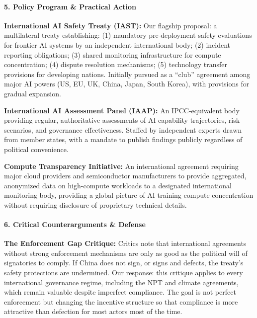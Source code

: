 \paragraph{5. Policy Program \& Practical
Action}\label{policy-program-practical-action-4}

\textbf{International AI Safety Treaty (IAST):} Our flagship proposal: a
multilateral treaty establishing: (1) mandatory pre-deployment safety
evaluations for frontier AI systems by an independent international
body; (2) incident reporting obligations; (3) shared monitoring
infrastructure for compute concentration; (4) dispute resolution
mechanisms; (5) technology transfer provisions for developing nations.
Initially pursued as a ``club'' agreement among major AI powers (US, EU,
UK, China, Japan, South Korea), with provisions for gradual expansion.

\textbf{International AI Assessment Panel (IAAP):} An IPCC-equivalent
body providing regular, authoritative assessments of AI capability
trajectories, risk scenarios, and governance effectiveness. Staffed by
independent experts drawn from member states, with a mandate to publish
findings publicly regardless of political convenience.

\textbf{Compute Transparency Initiative:} An international agreement
requiring major cloud providers and semiconductor manufacturers to
provide aggregated, anonymized data on high-compute workloads to a
designated international monitoring body, providing a global picture of
AI training compute concentration without requiring disclosure of
proprietary technical details.

\paragraph{6. Critical Counterarguments \&
Defense}\label{critical-counterarguments-defense-4}

\textbf{The Enforcement Gap Critique:} Critics note that international
agreements without strong enforcement mechanisms are only as good as the
political will of signatories to comply. If China does not sign, or
signs and defects, the treaty's safety protections are undermined. Our
response: this critique applies to every international governance
regime, including the NPT and climate agreements, which remain valuable
despite imperfect compliance. The goal is not perfect enforcement but
changing the incentive structure so that compliance is more attractive
than defection for most actors most of the time.


